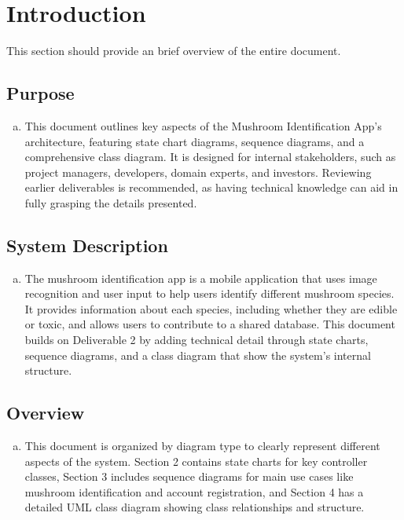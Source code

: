 \documentclass[]{article}
\begin{document}
\section{Introduction}
\label{sec:introduction}

This section should provide an brief overview of the entire document.

\subsection{Purpose}
\label{sub:purpose}
\begin{enumerate}[a)]
	\item This document outlines key aspects of the Mushroom Identification App's architecture, featuring state chart diagrams, sequence diagrams, and a comprehensive class diagram.
    It is designed for internal stakeholders, such as project managers, developers, domain experts, and investors. Reviewing earlier deliverables is recommended, as having technical knowledge can aid in fully grasping the details presented.
\end{enumerate}

\subsection{System Description}
\label{sub:system_description}
\begin{enumerate}[a)]
	\item The mushroom identification app is a mobile application that uses image recognition and user input to help users identify different mushroom species. It provides information about each species, including whether they are edible or toxic, and allows users to contribute to a shared database. This document builds on Deliverable 2 by adding technical detail through state charts, sequence diagrams, and a class diagram that show the system’s internal structure.
\end{enumerate}

\subsection{Overview}
\label{sub:overview}
\begin{enumerate}[a)]
	\item This document is organized by diagram type to clearly represent different aspects of the system. Section 2 contains state charts for key controller classes, Section 3 includes sequence diagrams for main use cases like mushroom identification and account registration, and Section 4 has a detailed UML class diagram showing class relationships and structure.
\end{enumerate}
\end{document}

